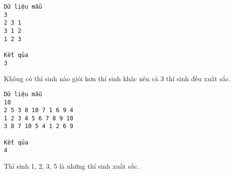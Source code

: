 \begin{verbatim}
Dữ liệu mẫu
3 
2 3 1
3 1 2
1 2 3

Kết qủa
3
\end{verbatim}

   Không có thí sinh nào giỏi hơn thí sinh khác nên cả 3 thí sinh đều xuất sắc.  
\begin{verbatim}
Dữ liệu mẫu
10 
2 5 3 8 10 7 1 6 9 4
1 2 3 4 5 6 7 8 9 10
3 8 7 10 5 4 1 2 6 9

Kết qủa
4
\end{verbatim}

   Thí sinh 1, 2, 3, 5 là những thí sinh xuất sắc.